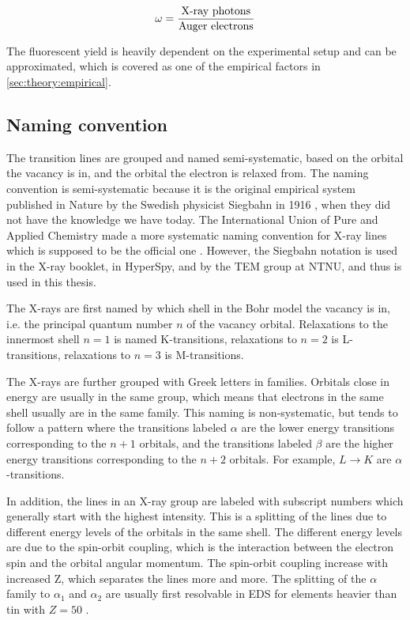\begin{equation}
    \label{eq:theory:theoreticalxray:yield}
    \omega = \frac{\textnormal{X-ray photons}}{\textnormal{Auger electrons}}
\end{equation}


The fluorescent yield is heavily dependent on the experimental setup and can be approximated, which is covered as one of the empirical factors in \cref{sec:theory:empirical}.


%
%
\subsection{Naming convention}
\label{sec:theory:theoreticalxray:naming}

The transition lines are grouped and named semi-systematic, based on the orbital the vacancy is in, and the orbital the electron is relaxed from.
The naming convention is semi-systematic because it is the original empirical system published in Nature by the Swedish physicist Siegbahn in 1916 \cite{siegbahn_relations_1916}, when they did not have the knowledge we have today.
The International Union of Pure and Applied Chemistry made a more systematic naming convention for X-ray lines which is supposed to be the official one \cite[Ch. 4.2.4]{goldstein_scanning_2018}.
However, the Siegbahn notation is used in the X-ray booklet, in HyperSpy, and by the TEM group at NTNU, and thus is used in this thesis.

The X-rays are first named by which shell in the Bohr model the vacancy is in, i.e. the principal quantum number $n$ of the vacancy orbital.
Relaxations to the innermost shell $n=1$ is named K-transitions, relaxations to $n=2$ is L-transitions, relaxations to $n=3$ is M-transitions.

The X-rays are further grouped with Greek letters in families. %
Orbitals close in energy are usually in the same group, which means that electrons in the same shell usually are in the same family.
This naming is non-systematic, but tends to follow a pattern where the transitions labeled $\alpha$ are the lower energy transitions corresponding to the $n+1$ orbitals, and the transitions labeled $\beta$ are the higher energy transitions corresponding to the $n+2$ orbitals.
For example, $L \rightarrow K$ are $\alpha$-transitions.

In addition, the lines in an X-ray group are labeled with subscript numbers which generally start with the highest intensity. %
This is a splitting of the lines due to different energy levels of the orbitals in the same shell.
The different energy levels are due to the spin-orbit coupling, which is the interaction between the electron spin and the orbital angular momentum.
The spin-orbit coupling increase with increased Z, which separates the lines more and more.
The splitting of the $\alpha$ family to $\alpha_1$ and $\alpha_2$ are usually first resolvable in EDS for elements heavier than tin with $ Z = 50$ \cite[Ch. 8.2.2.3]{hollas_modern_2004}. %

